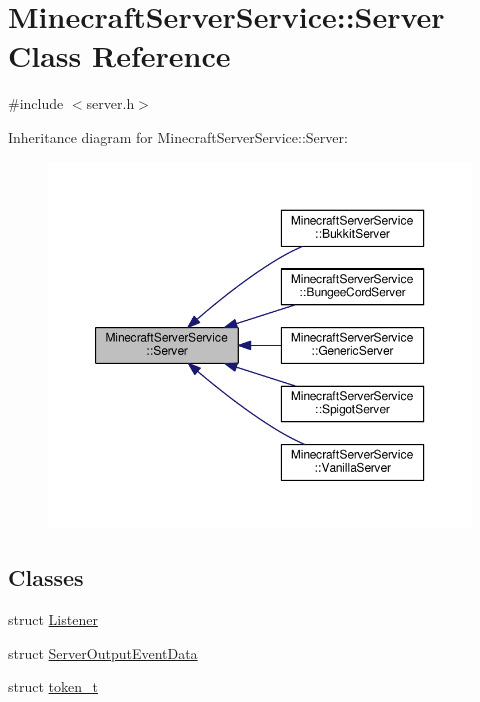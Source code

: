 \hypertarget{class_minecraft_server_service_1_1_server}{}\section{Minecraft\+Server\+Service\+:\+:Server Class Reference}
\label{class_minecraft_server_service_1_1_server}


{\ttfamily \#include $<$server.\+h$>$}



Inheritance diagram for Minecraft\+Server\+Service\+:\+:Server\+:\nopagebreak
\begin{figure}[H]
\begin{center}
\leavevmode
\includegraphics[width=350pt]{class_minecraft_server_service_1_1_server__inherit__graph}
\end{center}
\end{figure}
\subsection*{Classes}
\begin{DoxyCompactItemize}
\item 
struct \hyperlink{struct_minecraft_server_service_1_1_server_1_1_listener}{Listener}
\item 
struct \hyperlink{struct_minecraft_server_service_1_1_server_1_1_server_output_event_data}{Server\+Output\+Event\+Data}
\item 
struct \hyperlink{struct_minecraft_server_service_1_1_server_1_1token__t}{token\+\_\+t}
\end{DoxyCompactItemize}
